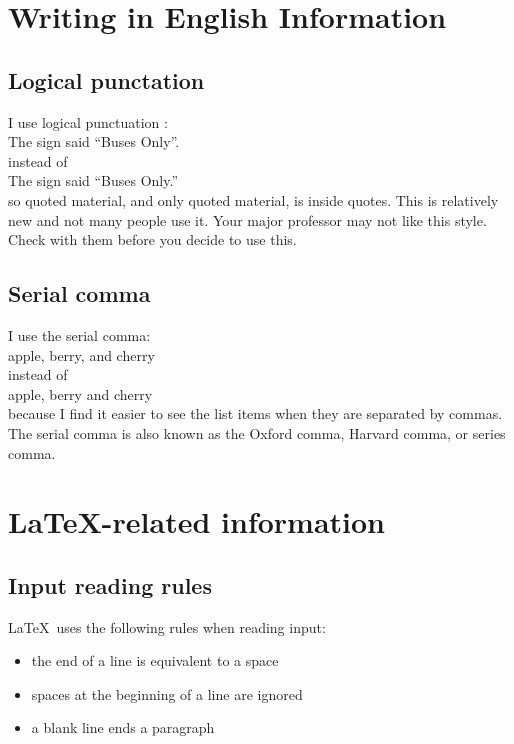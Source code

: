 \section{Writing in English Information}

\subsection{Logical punctation}

I use logical punctuation
  \cite{yagoda2011}:\\
   The sign said ``Buses Only''.\\
instead of\\
   The sign said ``Buses Only.''\\
so quoted material,
and only quoted material,
is inside quotes.
This is relatively new and not many people use it.
Your major professor may not like this style.
Check with them before you decide to use this.


\subsection{Serial comma}

I use the serial comma:\\
   apple, berry, and cherry\\
instead of\\
   apple, berry and cherry\\
because I find it easier
to see the list items
when they are separated by commas.
The serial comma is also known as the
Oxford comma,
Harvard comma,
or series comma.

\section{\LaTeX-related information}

\subsection{Input reading rules}

\LaTeX\ uses the following rules when reading input:
\begin{itemize}
  \item the end of a line is equivalent to a space
  \item spaces at the beginning of a line are ignored
  \item a blank line ends a paragraph
\end{itemize}

